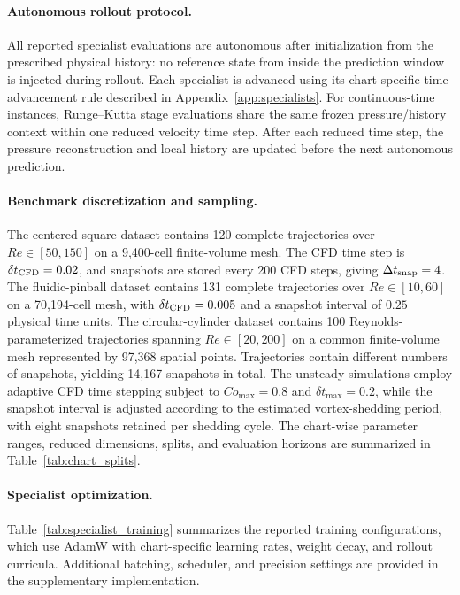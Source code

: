 \documentclass{article}
\begin{document}
\paragraph{Autonomous rollout protocol.}
All reported specialist evaluations are autonomous after initialization from the prescribed physical history: no reference state from inside the prediction window is injected during rollout.
Each specialist is advanced using its chart-specific time-advancement rule described in Appendix~\ref{app:specialists}. For continuous-time instances, Runge--Kutta stage evaluations share the same frozen pressure/history context within one reduced velocity time step. After each reduced time step, the pressure reconstruction and local history are updated before the next autonomous prediction.


\paragraph{Benchmark discretization and sampling.}
The centered-square dataset contains 120 complete trajectories over
$Re\in[50,150]$ on a 9,400-cell finite-volume mesh. The CFD time step is $\delta t_{\rm CFD}=0.02$, and snapshots are stored every 200 CFD steps, giving $\Delta t_{\rm snap}=4$. The fluidic-pinball dataset contains 131 complete trajectories over $Re\in[10,60]$ on a 70,194-cell mesh, with $\delta t_{\rm CFD}=0.005$ and a snapshot interval of $0.25$ physical time units. The circular-cylinder dataset contains 100 Reynolds-parameterized trajectories spanning
$Re\in[20,200]$ on a common finite-volume mesh represented by 97,368 spatial points. Trajectories contain different numbers of snapshots, yielding 14,167 snapshots in total. The unsteady simulations employ adaptive CFD time stepping subject to $Co_{\max}=0.8$ and $\delta t_{\max}=0.2$, while the snapshot interval is adjusted according to the estimated vortex-shedding period, with eight snapshots retained per shedding cycle. The chart-wise parameter ranges, reduced dimensions, splits, and evaluation horizons are summarized in Table~\ref{tab:chart_splits}.


\paragraph{Specialist optimization.}
Table~\ref{tab:specialist_training} summarizes the reported training configurations, which use AdamW with chart-specific learning rates, weight decay, and rollout curricula.
Additional batching, scheduler, and precision settings are provided in the supplementary implementation.
\end{document}
